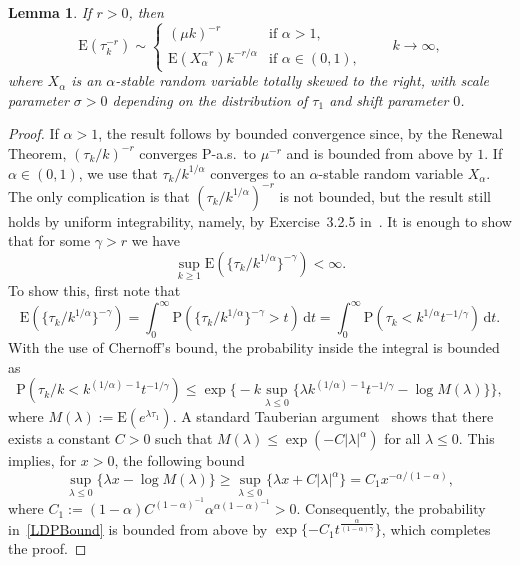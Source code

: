 \documentclass[11pt]{article}
\newtheorem{lemm}[theo]{Lemma}
\theoremstyle{definition}
\numberwithin{equation}{section}
\numberwithin{figure}{section}
\numberwithin{table}{section}
\newcommand{\ga}{\alpha}
\newcommand{\gga}{\gamma}
\newcommand{\gl}{\lambda}
\newcommand{\gs}{\sigma}
\newcommand{\dd}{\mathrm{d}}
\newcommand\bP{\ensuremath{\mathrm{P}}}
\newcommand\bE{\ensuremath{\mathrm{E}}}
\begin{document}
\begin{lemm}\label{lem:conv.power.tauk}
If $r > 0$, then
\begin{equation}
\bE(\tau_k^{- r}) \sim
\begin{cases}
(\mu k)^{- r} & \text{if } \ga > 1,\\[4pt]
\bE(X_\ga^{- r}) k^{- r/\ga} & \text{if } \ga \in (0,1),
\end{cases}
\qquad k \to \infty,
\end{equation}
where $X_\ga$ is an $\ga$-stable random variable totally skewed to the right, with scale parameter $\gs > 0$ depending on the distribution of $\tau_1$ and shift parameter $0$.
\end{lemm}

\begin{proof}
If $\ga > 1$, the result follows by bounded convergence since, by the Renewal Theorem, $(\tau_k/k)^{- r}$ converges $\bP$-a.s.~to $\mu^{- r}$ and is bounded from above by $1$. If $\ga \in (0,1)$, we use that $\tau_k/k^{1/\ga}$ converges to an $\ga$-stable random variable $X_\ga$. The only complication is that $(\tau_k/k^{1/\ga})^{- r}$ is not bounded, but the result still holds by uniform integrability, namely, by Exercise~3.2.5 in~\cite{Du10}. It is enough to show that for some $\gga > r$ we have
\begin{equation}\label{eq:UItau}
\sup_{k\geq1} \bE(\{\tau_k/k^{1/\ga}\}^{- \gga}) < \infty.
\end{equation}
To show this, first note that
\begin{equation}\label{ExpectationTail}
\bE(\{\tau_k/k^{1/\ga}\}^{- \gga}) = \int_0^\infty \bP(\{\tau_k/k^{1/\ga}\}^{- \gga} > t) \, \dd t = \int_0^\infty \bP(\tau_k < k^{1/\ga} t^{- 1/\gga}) \, \dd t.
\end{equation}
With the use of Chernoff's bound, the probability inside the integral is bounded as
\begin{equation}\label{LDPBound}
\bP(\tau_k/k < k^{(1/\ga) - 1} t^{- 1/\gga}) \leq \exp \Big\{ - k \sup_{\gl\leq0} \{\gl k^{(1/\ga) - 1} t^{- 1/\gga} - \log M(\gl)\} \Big\},
\end{equation}
where $M(\gl) := \bE(e^{\gl \tau_1})$. A standard Tauberian argument~\cite[(5.22) of Chapter~XIII]{Feller71} shows that there exists a constant $C > 0$ such that $M(\gl) \leq \exp({- C |\gl|^\ga})$ for all $\gl \leq 0$. This implies, for $x > 0$, the following bound
\begin{equation}
\sup_{\gl\leq0} \{\gl x - \log M(\gl)\} \geq \sup_{\gl\leq0} \{\gl x + C |\gl|^\ga\} = C_1 x^{- \ga/(1 - \ga)},
\end{equation}
where $C_1 := (1 - \ga) C^{(1 - \ga)^{-1}} \ga^{\ga (1 - \ga)^{-1}} > 0$. Consequently, the probability in~\eqref{LDPBound} is bounded from above by $\exp\{- C_1 t^\frac{\ga}{(1 - \ga) \gga}\}$, which completes the proof.
\end{proof}
\end{document}

